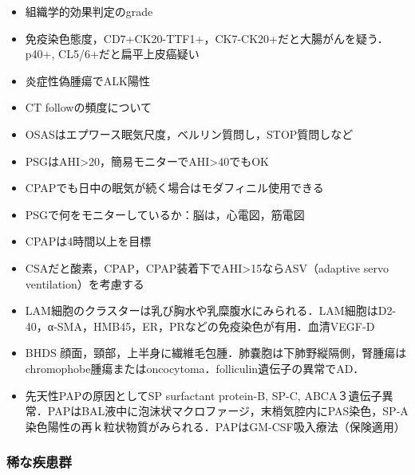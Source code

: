 \begin{itemize}
\item 組織学的効果判定のgrade
\item 免疫染色態度，CD7+CK20-TTF1+，CK7-CK20+だと大腸がんを疑う．p40+, CL5/6+だと扁平上皮癌疑い
\item 炎症性偽腫瘍でALK陽性
\item CT followの頻度について
\item OSASはエプワース眠気尺度，ベルリン質問し，STOP質問しなど
\item PSGはAHI>20，簡易モニターでAHI>40でもOK
\item CPAPでも日中の眠気が続く場合はモダフィニル使用できる
\item PSGで何をモニターしているか：脳は，心電図，筋電図
\item CPAPは4時間以上を目標
\item CSAだと酸素，CPAP，CPAP装着下でAHI>15ならASV（adaptive servo ventilation）を考慮する
\item LAM細胞のクラスターは乳び胸水や乳糜腹水にみられる．LAM細胞はD2-40，α-SMA，HMB45，ER，PRなどの免疫染色が有用．血清VEGF-D
\item BHDS 顔面，頸部，上半身に繊維毛包腫．肺嚢胞は下肺野縦隔側，腎腫瘍はchromophobe腫瘍またはoncocytoma．folliculin遺伝子の異常でAD．
\item 先天性PAPの原因としてSP surfactant protein-B, SP-C, ABCA３遺伝子異常．PAPはBAL液中に泡沫状マクロファージ，末梢気腔内にPAS染色，SP-A染色陽性の再ｋ粒状物質がみられる．PAPはGM-CSF吸入療法（保険適用）

\end{itemize}




\subsubsection{稀な疾患群}

